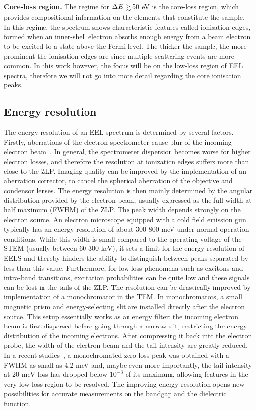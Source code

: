 {\bf Core-loss region.} The regime for $\Delta E \gsim 50$ eV is the core-loss region,
which provides compositional information
on the elements that constitute the sample. 
%
In this regime, the spectrum shows characteristic features called ionisation edges, 
formed when an inner-shell electron absorbs enough energy from a beam electron 
to be excited to a state above the Fermi level. 
%
The thicker the sample, the more prominent the ionisation edges are 
since multiple scattering events are more common. 
%
In this work however, the focus will be on the low-loss region of EEL spectra, 
therefore we will not go into more detail regarding the core ionisation peaks.


\subsection{Energy resolution}
The energy resolution of an EEL spectrum is determined by several factors. 
%
Firstly, aberrations of the electron spectrometer cause blur of the incoming 
electron beam~\cite{Freitag:2005}. 
%
In general, the spectrometer dispersion becomes worse for higher electron losses,
and therefore the resolution at ionization edges suffers more than close to the
ZLP.
%
Imaging quality can be improved by the implementation of an aberration corrector, 
to cancel the spherical aberration of the objective and condensor lenses. 
%
The energy resolution is then mainly determined by the angular distribution 
provided by the electron beam, usually expressed as the full width at half maximum (FWHM) of the ZLP. 
%
The peak width depends strongly on the electron source. 
An  electron  microscope  equipped  with  a  cold
field emission gun typically has an energy resolution of about 300-800 meV 
under normal operation conditions.  
%
While this width is small compared to the operating voltage of the STEM (usually between 60-300 keV), 
it sets a limit for the energy resolution of EELS and thereby hinders the ability to distinguish 
between peaks separated by less than this value. 
%
Furthermore, for low-loss phenomena such as excitons and intra-band transitions, 
excitation probabilities can be quite low and these signals can be lost in the tails of the ZLP.
%
The resolution can be drastically improved by implementation of a monochromator 
in the TEM. 
%
In monochromators, a small magnetic prism and energy-selecting slit are installed 
directly after the electron source.
%
This setup essentially works as an energy filter: the incoming electron beam is first dispersed 
before going through a narrow slit, restricting the energy distribution of the incoming electrons. 
%
After compressing it back into the electron probe, the width of the electron beam 
and the tail intensity are greatly reduced.  
%
In a recent studies~\cite{Krivanek:2009}, a monochromated zero-loss peak was obtained 
with a FWHM as small as 4.2 meV and, maybe even more importantly, 
the tail intensity at 20 meV loss has dropped below $10^{-3}$ of its maximum, 
allowing features in the very low-loss region to be resolved. 
%
The improving energy resolution opens new possibilities for accurate measurements
on the bandgap and the 
dielectric function.

